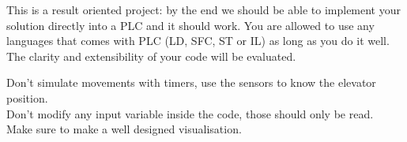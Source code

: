 \documentclass{../template/tp}
\begin{document}
This is a result oriented project: by the end we should be able to implement your solution directly into a PLC and it should work.
You are allowed to use any languages that comes with PLC (LD, SFC, ST or IL) as long as you do it well. The clarity and extensibility of your code will be evaluated.

Don't simulate movements with timers, use the sensors to know the elevator position.\\
Don't modify any input variable inside the code, those should only be read.\\
Make sure to make a well designed visualisation.
\end{document}
